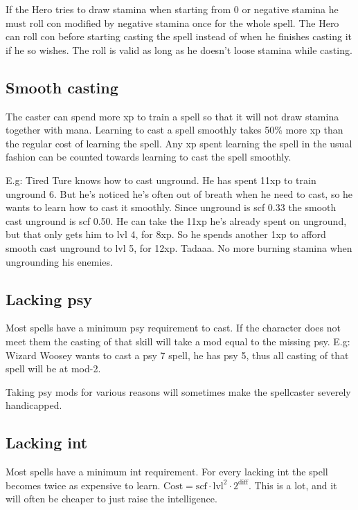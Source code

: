 If the Hero tries to draw stamina when starting from 0 or negative stamina he must roll con modified by negative stamina once for the whole spell. The Hero can roll con before starting casting the spell instead of when he finishes casting it if he so wishes. The roll is valid as long as he doesn't loose stamina while casting.


\subsection*{Smooth casting}
The caster can spend more xp to train a spell so that it will not draw stamina together with mana. Learning to cast a spell smoothly takes 50\% more xp than the regular cost of learning the spell. Any xp spent learning the spell in the usual fashion can be counted towards learning to cast the spell smoothly.

E.g: Tired Ture knows how to cast unground. He has spent 11xp to train unground 6. But he's noticed he's often out of breath when he need to cast, so he wants to learn how to cast it smoothly. Since unground is scf 0.33 the smooth cast unground is scf 0.50. He can take the 11xp he's already spent on unground, but that only gets him to lvl 4, for 8xp. So he spends another 1xp to afford smooth cast unground to lvl 5, for 12xp. Tadaaa. No more burning stamina when ungrounding his enemies.


\subsection*{Lacking psy}
Most spells have a minimum psy requirement to cast. If the character does not meet them the casting of that skill will take a mod equal to the missing psy.
E.g: Wizard Woosey wants to cast a psy 7 spell, he has psy 5, thus all casting of that spell will be at mod-2.

Taking psy mods for various reasons will sometimes make the spellcaster severely handicapped.


\subsection*{Lacking int}
Most spells have a minimum int requirement. For every lacking int the spell becomes twice as expensive to learn. $\mathrm{Cost} = \mathrm{scf} \cdot \mathrm{lvl}^2 \cdot 2^{\mathrm{diff}}$. This is a lot, and it will often be cheaper to just raise the intelligence.


